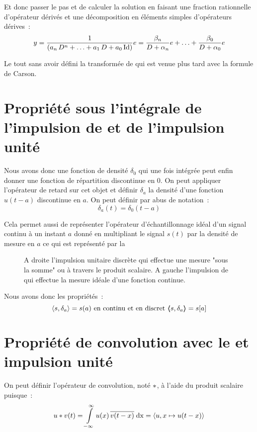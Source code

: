 Et donc passer le pas et de calculer la solution en faisant une
fraction rationnelle d'opérateur dérivés et une décomposition en
éléments simples d'opérateurs dérives~:
$$
y = \frac{1}{\left(a_n\,D^n + \ldots +a_1\, D  + a_0 \,\mathrm{Id}\right)} e = \frac{\beta_n}{D + \alpha_n} e + \ldots + \frac{\beta_0}{D + \alpha_0} e
$$

Le tout sans avoir défini la transformée de \Laplace{} qui est venue
plus tard avec la formule de Carson.


\section{Propriété sous l'intégrale de l'impulsion de \Dirac{} et de l'impulsion unité}

Nous avons donc une fonction de densité $\delta_0$ qui une fois
intégrée peut enfin donner une fonction de répartition discontinue en
$0$. On peut appliquer l'opérateur de retard sur cet objet et définir
$\delta_a$ la densité d'une fonction $u(t-a)$ discontinue en $a$. On peut définir par abus de notation~:
$$
\delta_a(t)= \delta_0(t-a)
$$

Cela permet aussi de représenter l'opérateur d'échantillonnage idéal d'un signal continu à un instant $a$ donné en multipliant le signal $s(t)$ par la densité de mesure en $a$ ce qui est représenté par la~
\begin{figure}[ht!]
  \centering
  \caption{A droite l'impulsion unitaire discrète qui effectue une mesure "sous la somme" ou à travers le produit scalaire. A gauche l'impulsion de \Dirac{} qui effectue la mesure idéale d'une fonction continue.}
  \label{fig:delta_mesure}
\end{figure}

Nous avons donc les propriétés~:
$$
\langle s,\delta_a\rangle=s(a) \text{ en continu et en discret } \langle\!\!\langle s,\delta_a\rangle\!\!\rangle=s[a] 
$$

\section{Propriété de convolution avec le \Dirac{} et impulsion unité}

On peut définir l'opérateur de convolution, noté $\ast$, à l'aide du produit scalaire puisque~:
\begin{equation}
  \label{eq:convolution}
  u\ast v(t) = \int\limits_{-\infty}^{\infty}{u(x)\,\overline{v(t-x)}\;\mathrm{d{x}}} = \langle u,x\mapsto u(t-x)\rangle
\end{equation}

